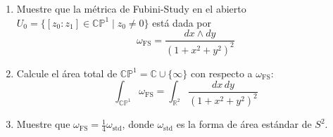\begin{problem}
\leavevmode
\begin{enumerate}
    \item Muestre que la métrica de Fubini-Study en el abierto $U_0 = \{ [z_0 : z_1] \in \mathbb {CP}^1 \mid z_0 \ne 0 \}$ está dada por
    $$\omega_\mathrm{FS} = \frac {dx \wedge dy} {(1 + x^2 + y^2)^2}$$
    
    \item Calcule el área total de $\mathbb {CP}^1 = \mathbb C \cup \{ \infty \}$ con respecto a $\omega_\mathrm{FS}$:
    $$\int_{\mathbb {CP}^1} \omega_\mathrm{FS} = \int_{\mathbb R^2} \frac {dx \, dy} {(1 + x^2 + y^2)^2}$$
    
    \item Muestre que $\omega_\mathrm{FS} = \tfrac 14 \omega_\mathrm{std}$, donde $\omega_\mathrm{std}$ es la forma de área estándar de $S^2$.
\end{enumerate}
\end{problem}

